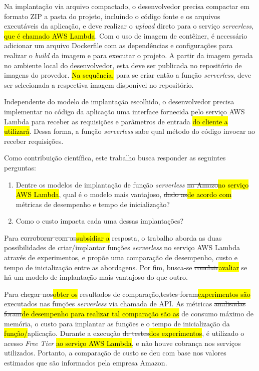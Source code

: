 \documentclass[10pt,conference]{IEEEtran}
\begin{document}
Na implantação via arquivo compactado, o desenvolvedor precisa compactar em formato ZIP a pasta do projeto, incluindo o código fonte e os arquivos executáveis da aplicação, e deve realizar o \textit{upload} direto para o serviço \textit{serverless}, \hl{que é chamado AWS Lambda}. Com o uso de imagem de contêiner, é necessário adicionar um arquivo Dockerfile com as dependências e configurações para realizar o \textit{build} da imagem e para executar o projeto. A partir da imagem gerada no ambiente local do desenvolvedor, esta deve ser publicada no repositório de imagens do provedor. \hl{Na sequência,} para se criar então a  função \textit{serverless}, deve ser selecionada a respectiva imagem disponível no repositório. 

Independente do modelo de implantação escolhido, o desenvolvedor precisa implementar no código da aplicação uma interface fornecida pelo serviço AWS Lambda para receber as requisições e parâmetros de entrada \hl{do cliente a utilizará}. Dessa forma, a função \textit{serverless} sabe qual método do código invocar ao receber requisições.

Como contribuição científica, este trabalho busca responder as seguintes perguntas:
\begin{enumerate}
  \item Dentre os modelos de implantação de função \textit{serverless} \st{na Amazo}\hl{no serviço AWS Lambda}, qual é o modelo mais vantajoso, \st{dado as}\hl{de acordo com} métricas de desempenho e tempo de inicialização? 
  \item Como o custo impacta cada uma dessas implantações? 
\end{enumerate}

Para \st{corroborar com as}\hl{subsidiar a} resposta, o trabalho aborda as duas possibilidades de criar/implantar funções \textit{serverless} no serviço AWS Lambda através de experimentos, e propõe uma comparação de desempenho, custo e tempo de inicialização entre as abordagens. Por fim, busca-se \st{concluir}\hl{avaliar} se há um modelo de implantação mais vantajoso do que outro.

Para \st{chegar nos}\hl{obter os} resultados de comparação,\st{testes foram}\hl{experimentos são} executados nas funções \textit{serverless} via chamada de API. As métricas \st{analisadas foram}\hl{de desempenho para realizar tal comparação são as} de consumo máximo de memória, o custo para implantar as funções e o tempo de inicialização da \hl{função/}aplicação. Durante a execução \st{de testes}\hl{dos experimentos}, é utilizado o acesso \textit{Free Tier} \hl{ao serviço AWS Lambda}, e não houve cobrança nos serviços utilizados. Portanto, a comparação de custo se deu com base nos valores estimados que são informados pela empresa Amazon.
\end{document}
